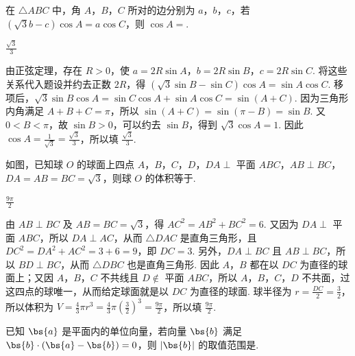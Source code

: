 \begin{problem}
在 \(\triangle ABC\) 中，角 \(A\)，\(B\)，\(C\) 所对的边分别为 \(a\)，\(b\)，\(c\)，若 \((\sqrt{3}b - c)\cos A = a\cos C\)，则 \(\cos A = \)\fillinblank{}.
\end{problem}

\begin{answer}
\(\frac{\sqrt{3}}{3}\)
\end{answer}

\begin{solution}
由正弦定理，存在 \(R>0\)，使 \(a=2R\sin A\)，\(b=2R\sin B\)，\(c=2R\sin C\). 将这些关系代入题设并约去正数 \(2R\)，得 \((\sqrt3\sin B-\sin C)\cos A=\sin A\cos C\). 移项后，\(\sqrt3\sin B\cos A=\sin C\cos A+\sin A\cos C=\sin(A+C)\). 因为三角形内角满足 \(A+B+C=\pi\)，所以 \(\sin(A+C)=\sin(\pi-B)=\sin B\). 又 \(0<B<\pi\)，故 \(\sin B>0\)，可以约去 \(\sin B\)，得到 \(\sqrt3\cos A=1\). 因此 \(\cos A=\frac1{\sqrt3}=\frac{\sqrt3}{3}\)，所以填 \(\frac{\sqrt3}{3}\).
\end{solution}

\begin{problem}
如图，已知球 \(O\) 的球面上四点 \(A\)，\(B\)，\(C\)，\(D\)，\(DA \perp\) 平面 \(ABC\)，\(AB \perp BC\)，\(DA = AB = BC = \sqrt{3}\)，则球 \(O\) 的体积等于\fillinblank{}.

\end{problem}

\begin{answer}
\(\frac{9\pi}{2}\)
\end{answer}

\begin{solution}
由 \(AB\perp BC\) 及 \(AB=BC=\sqrt3\)，得 \(AC^2=AB^2+BC^2=6\). 又因为 \(DA\perp\) 平面 \(ABC\)，所以 \(DA\perp AC\)，从而 \(\triangle DAC\) 是直角三角形，且 \(DC^2=DA^2+AC^2=3+6=9\)，即 \(DC=3\). 另外，\(DA\perp BC\) 且 \(AB\perp BC\)，所以 \(BD\perp BC\)，从而 \(\triangle DBC\) 也是直角三角形. 因此 \(A\)，\(B\) 都在以 \(DC\) 为直径的球面上；又因 \(A\)，\(B\)，\(C\) 不共线且 \(D\notin\) 平面 \(ABC\)，所以 \(A\)，\(B\)，\(C\)，\(D\) 不共面，过这四点的球唯一，从而给定球面就是以 \(DC\) 为直径的球面. 球半径为 \(r=\frac{DC}{2}=\frac32\)，所以体积为 \(V=\frac43\pi r^3=\frac43\pi\left(\frac32\right)^3=\frac{9\pi}{2}\)，所以填 \(\frac{9\pi}{2}\).
\end{solution}

\begin{problem}
已知 \(\bs{a}\) 是平面内的单位向量，若向量 \(\bs{b}\) 满足 \(\bs{b} \cdot (\bs{a} - \bs{b}) = 0\)，则 \(|\bs{b}|\) 的取值范围是\fillinblank{}.
\end{problem}

